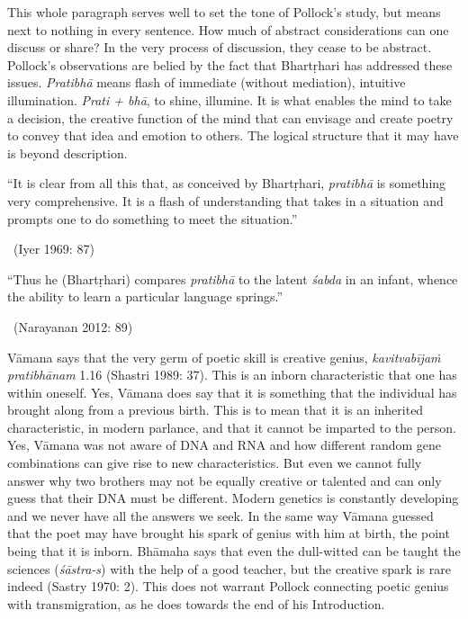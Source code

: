 This whole paragraph serves well to set the tone of Pollock’s study, but means next to nothing in every sentence. How much of abstract considerations can one discuss or share? In the very process of discussion, they cease to be abstract. Pollock’s observations are belied by the fact that Bhartṛhari has addressed these issues. \textit{Pratibhā} means flash of immediate (without mediation), intuitive illumination. \textit{Prati + bhā}, to shine, illumine. It is what enables the mind to take a decision, the creative function of the mind that can envisage and create poetry to convey that idea and emotion to others. The logical structure that it may have is beyond description.

\begin{myquote}
“It is clear from all this that, as conceived by Bhartṛhari, \textit{pratibhā }is something very comprehensive. It is a flash of understanding that takes in a situation and prompts one to do something to meet the situation.” 

~\hfill (Iyer 1969: 87)
\end{myquote}

\begin{myquote}
“Thus he (Bhartṛhari) compares \textit{pratibhā} to the latent \textit{śabda} in an infant, whence the ability to learn a particular language springs.” 

~\hfill (Narayanan 2012: 89)
\end{myquote}

Vāmana says that the very germ of poetic skill is creative genius, \textit{kavitvabījaṁ pratibhānam }1.16 (Shastri 1989: 37). This is an inborn characteristic that one has within oneself. Yes, Vāmana does say that it is something that the individual has brought along from a previous birth. This is to mean that it is an inherited characteristic, in modern parlance, and that it cannot be imparted to the person. Yes, Vāmana was not aware of DNA and RNA and how different random gene combinations can give rise to new characteristics. But even we cannot fully answer why two brothers may not be equally creative or talented and can only guess that their DNA must be different. Modern genetics is constantly developing and we never have all the answers we seek. In the same way Vāmana guessed that the poet may have brought his spark of genius with him at birth, the point being that it is inborn. Bhāmaha says that even the dull-witted can be taught the sciences (\textit{śāstra-s}) with the help of a good teacher, but the creative spark is rare indeed (Sastry 1970: 2). This does not warrant Pollock connecting poetic genius with transmigration, as he does towards the end of his Introduction.

